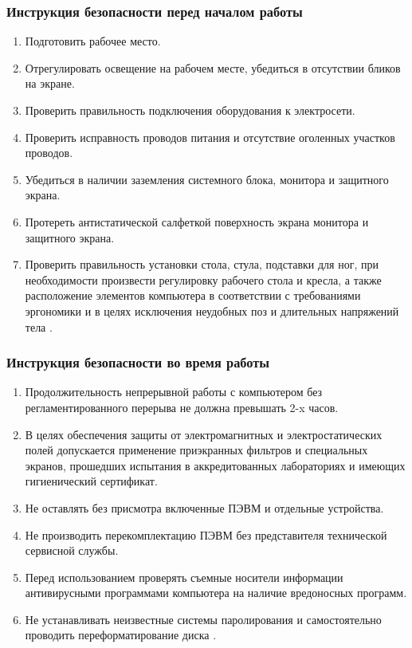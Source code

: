 \subsubsection{Инструкция безопасности перед началом работы}
\begin{enumerate}
\item Подготовить рабочее место.
\item Отрегулировать освещение на рабочем месте, убедиться в отсутствии бликов на экране.
\item Проверить правильность подключения оборудования к электросети.
\item Проверить исправность проводов питания и отсутствие оголенных участков проводов.
\item Убедиться в наличии заземления системного блока, монитора и защитного экрана.
\item Протереть антистатической салфеткой поверхность экрана монитора и защитного экрана.
\item Проверить правильность установки стола, стула, подставки для ног, при необходимости произвести регулировку рабочего стола и кресла, а также расположение элементов компьютера в соответствии с требованиями эргономики и в целях исключения неудобных поз и длительных напряжений тела \cite{bhzd_3}.
\end{enumerate}

\subsubsection{Инструкция безопасности во время работы}
\begin{enumerate}
\item Продолжительность непрерывной работы с компьютером без регламентированного перерыва не должна превышать 2-x часов.
\item В целях обеспечения защиты от электромагнитных и электростатических полей допускается применение приэкранных фильтров и специальных экранов, прошедших испытания в аккредитованных лабораториях и имеющих гигиенический сертификат.
\item Не оставлять без присмотра включенные ПЭВМ и отдельные устройства.
\item Не производить перекомплектацию ПЭВМ без представителя технической сервисной службы.
\item Перед использованием проверять съемные носители информации антивирусными программами компьютера на наличие вредоносных программ.
\item Не устанавливать неизвестные системы паролирования и самостоятельно проводить переформатирование диска \cite{bhzd_3}.
\end{enumerate}

